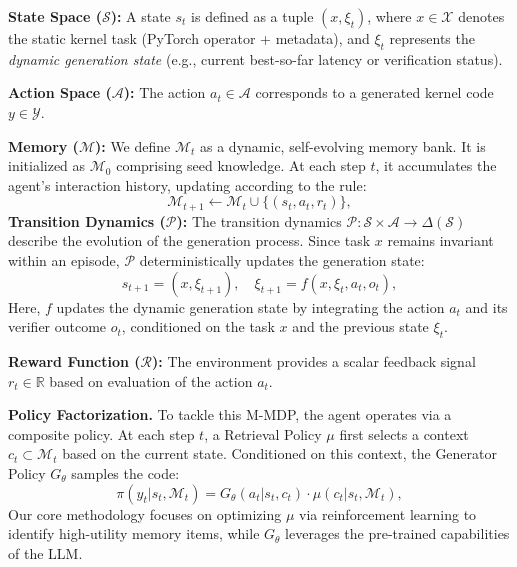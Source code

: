 \documentclass{article} %
\theoremstyle{definition}
\theoremstyle{remark}
\begin{document}
\textbf{State Space ($\mathcal{S}$):}
A state $s_t$ is defined as a tuple $(x, \xi_t)$, where $x \in \mathcal{X}$ denotes the static kernel task (PyTorch operator + metadata), and $\xi_t$ represents the \emph{dynamic generation state} (e.g., current best-so-far latency or verification status).

\textbf{Action Space ($\mathcal{A}$):}
The action $a_t \in \mathcal{A}$ corresponds to a generated kernel code $y \in \mathcal{Y}$.

\textbf{Memory ($\mathcal{M}$):}
We define $\mathcal{M}_t$ as a dynamic, self-evolving memory bank. It is initialized as $\mathcal{M}_0$ comprising seed knowledge. At each step $t$, it accumulates the agent's interaction history, updating according to the rule:
\begin{equation}
\mathcal{M}_{t+1} \leftarrow \mathcal{M}_t \cup \{ (s_t, a_t, r_t) \},
\end{equation}
\textbf{Transition Dynamics ($\mathcal{P}$):}
The transition dynamics $\mathcal{P}: \mathcal{S} \times \mathcal{A} \rightarrow \Delta(\mathcal{S})$ describe the evolution of the generation process.
Since task $x$ remains invariant within an episode, $\mathcal{P}$ deterministically updates the generation state:
\begin{equation}
s_{t+1} = (x, \xi_{t+1}), \quad \xi_{t+1} = f(x, \xi_t, a_t, o_t),
\end{equation}
Here, $f$ updates the dynamic generation state by integrating the action $a_t$ and its verifier outcome $o_t$, conditioned on the task $x$ and the previous state $\xi_t$.

\textbf{Reward Function ($\mathcal{R}$):}
The environment provides a scalar feedback signal $r_t \in \mathbb{R}$ based on evaluation of the action $a_t$. 

\textbf{Policy Factorization.} To tackle this M-MDP, the agent operates via a composite policy. At each step $t$, a Retrieval Policy $\mu$ first selects a context $c_t \subset \mathcal{M}_t$ based on the current state. Conditioned on this context, the Generator Policy $G_\theta$  samples the code:
\begin{equation}
\label{eq:policy_factorization}
\pi(y_t | s_t, \mathcal{M}_t) = G_\theta(a_t | s_t, c_t) \cdot \mu(c_t | s_t, \mathcal{M}_t),
\end{equation}
Our core methodology focuses on optimizing $\mu$ via reinforcement learning to identify high-utility memory items, while $G_\theta$ leverages the pre-trained capabilities of the LLM.
\end{document}
